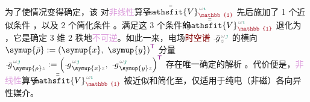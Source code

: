 为了使情况变得确定，该  对\textcolor{Plum}{非线性}算子 $\Xint{\mathcolor{gray}{-}}{25}{\bar{\bar{\mathsfit{V}}}}^{\;\! \mathcolor{gray}{\omega} \textcolor{PineGreen}{\imath}}_{\textcolor{Maroon}{\mathbb{1}}}$ 先后施加了 1 个近似条件 ，以及 2 个简化条件 。满足这 3 个条件的 $\Xint{\mathcolor{gray}{-}}{25}{\bar{\bar{\mathsfit{V}}}}^{\;\! \mathcolor{gray}{\omega} \textcolor{PineGreen}{\imath}}_{\textcolor{Maroon}{\mathbb{1}}}$ 退化为 ，它是确定 3 维 2 秩地\textcolor{Plum}{不可逆}。如此一来，电场\textcolor{Maroon}{时空谱} $\Xint{{}^{}_{\mathcolor{gray}{-}}}{10}{\bar{g}}^{\;\!\mathcolor{gray}{\omega} \textcolor{PineGreen}{\jmath}}_{\;\! \mathcolor{gray}{z}}$ 的横向 $\symup{\bar{\rho}} := \left( \symup{x},~ \symup{y} \right)^{\mathsf{\textcolor{Plum}{T}}}$ 分量 $\Xint{{}^{}_{\mathcolor{gray}{-}}}{10}{\bar{g}}^{\;\!\mathcolor{gray}{\omega} \textcolor{PineGreen}{\jmath}}_{\;\! \symup{\rho} \mathcolor{gray}{z}} := \left( \Xint{{}^{}_{\mathcolor{gray}{-}}}{10}{g}^{\;\!\mathcolor{gray}{\omega} \textcolor{PineGreen}{\jmath}}_{\;\! \symup{x} \mathcolor{gray}{z}},~ \Xint{{}^{}_{\mathcolor{gray}{-}}}{10}{g}^{\;\!\mathcolor{gray}{\omega} \textcolor{PineGreen}{\jmath}}_{\;\! \symup{y} \mathcolor{gray}{z}} \right)^{\mathsf{\textcolor{Plum}{T}}}$ 存在唯一确定的解析 。代价便是，\textcolor{Plum}{非线性}算子 $\Xint{\mathcolor{gray}{-}}{25}{\bar{\bar{\mathsfit{V}}}}^{\;\! \mathcolor{gray}{\omega} \textcolor{PineGreen}{\imath}}_{\textcolor{Maroon}{\mathbb{1}}}$ 被近似和简化至，仅适用于\textcolor{PineGreen}{纯电（非磁）各向异性}媒介。


